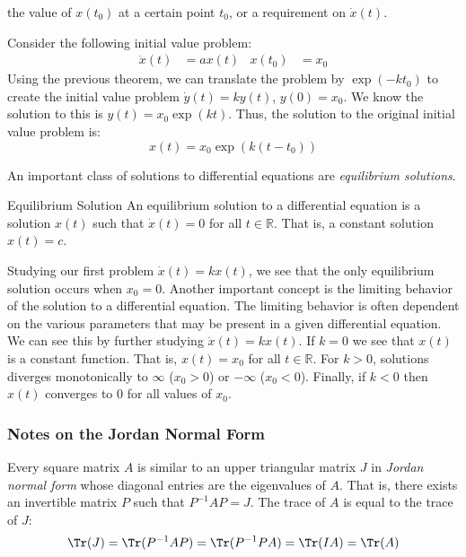 \documentclass[crop=false,class=book,oneside]{standalone}
\begin{document}
        the value of $x(t_{0})$ at a certain point
        $t_{0}$, or a requirement on $\dot{x}(t)$.
        \begin{frameexample}{}{}
            Consider the following initial value problem:
            \begin{align*}
                \dot{x}(t)&=ax(t)
                &
                x(t_{0})&=x_{0}
            \end{align*}
            Using the previous theorem, we can translate the
            problem by $\exp(-kt_{0})$ to create the initial
            value problem $\dot{y}(t)=ky(t)$, $y(0)=x_{0}$.
            We know the solution to this is
            $y(t)=x_{0}\exp(kt)$. Thus, the solution to the
            original initial value problem is:
            \begin{equation*}
                x(t)=x_{0}\exp(k(t-t_{0}))
            \end{equation*}
        \end{frameexample}
        An important class of solutions to differential
        equations are \textit{equilibrium solutions}.
        \begin{framedefinition}{Equilibrium Solution}{}
            An equilibrium solution to a differential
            equation is a solution $x(t)$ such that
            $\dot{x}(t)=0$ for all $t\in\mathbb{R}$.
            That is, a constant solution $x(t)=c$.
        \end{framedefinition}
        Studying our first problem $\dot{x}(t)=kx(t)$,
        we see that the only equilibrium solution
        occurs when $x_{0}=0$. Another important concept
        is the limiting behavior of the solution to a
        differential equation. The limiting behavior
        is often dependent on the various parameters that
        may be present in a given differential equation.
        We can see this by further studying $\dot{x}(t)=kx(t)$.
        If $k=0$ we see that $x(t)$ is a constant function. That
        is, $x(t)=x_{0}$ for all $t\in\mathbb{R}$. For $k>0$,
        solutions diverges monotonically to $\infty$
        ($x_{0}>0$) or $-\infty$ ($x_{0}<0$).
        Finally, if $k<0$ then $x(t)$ converges to $0$
        for all values of $x_{0}$.
        \subsubsection{Notes on the Jordan Normal Form}
            Every square matrix $A$ is similar to an upper
            triangular matrix $J$ in
            \textit{Jordan normal form} whose diagonal entries
            are the eigenvalues of $A$. That is, there exists
            an invertible matrix $P$ such that $P^{-1}AP=J$.
            The trace of $A$ is equal to the trace of $J$:
            \begin{equation*}
                \Tr(J)
                =\Tr(P^{-1}AP)
                =\Tr(P^{-1}PA)
                =\Tr(IA)=\Tr(A)
            \end{equation*}
\end{document}
